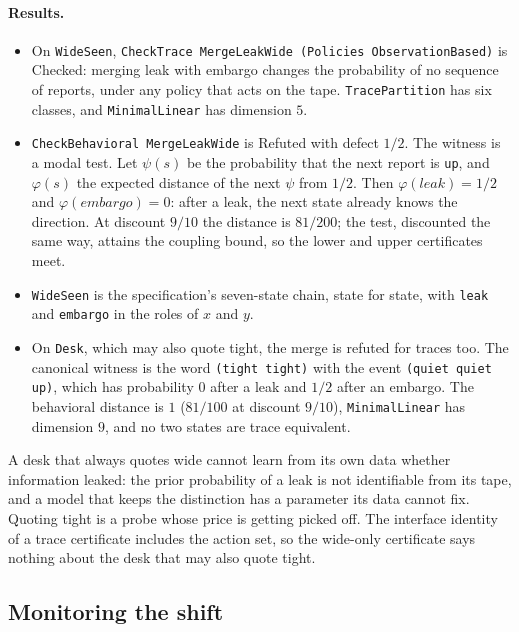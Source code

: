 \documentclass[11pt]{article}
\newcommand{\code}[1]{\texttt{#1}}
\theoremstyle{definition}
\theoremstyle{plain}
\begin{document}
\paragraph{Results.}
\begin{itemize}
\item On \code{WideSeen}, \code{CheckTrace MergeLeakWide (Policies ObservationBased)} is Checked: merging
leak with embargo changes the probability of no sequence of reports, under any policy that acts on the
tape. \code{TracePartition} has six classes, and \code{MinimalLinear} has dimension $5$.
\item \code{CheckBehavioral MergeLeakWide} is Refuted with defect $1/2$. The witness is a modal test. Let
$\psi(s)$ be the probability that the next report is \code{up}, and $\varphi(s)$ the expected distance of
the next $\psi$ from $1/2$. Then $\varphi(\mathit{leak})=1/2$ and $\varphi(\mathit{embargo})=0$: after a
leak, the next state already knows the direction. At discount $9/10$ the distance is $81/200$; the test,
discounted the same way, attains the coupling bound, so the lower and upper certificates meet.
\item \code{WideSeen} is the specification's seven-state chain, state for state, with \code{leak} and
\code{embargo} in the roles of $x$ and $y$.
\item On \code{Desk}, which may also quote tight, the merge is refuted for traces too. The canonical
witness is the word \code{(tight tight)} with the event \code{(quiet quiet up)}, which has probability $0$
after a leak and $1/2$ after an embargo. The behavioral distance is $1$ ($81/100$ at discount $9/10$),
\code{MinimalLinear} has dimension $9$, and no two states are trace equivalent.
\end{itemize}

A desk that always quotes wide cannot learn from its own data whether information leaked: the prior
probability of a leak is not identifiable from its tape, and a model that keeps the distinction has
a parameter its data cannot fix. Quoting tight is a probe whose price is getting picked off. The
interface identity of a trace certificate includes the action set, so the wide-only certificate says
nothing about the desk that may also quote tight.

\subsection{Monitoring the shift}
\end{document}
